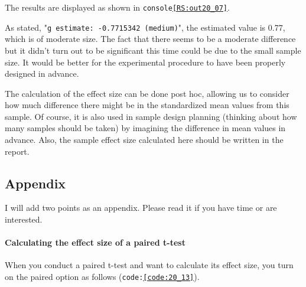 \documentclass{ltjsbook}
\begin{document}
The results are displayed as shown in \texttt{console\ref{RS:out20_07}}.


As stated, "\texttt{g estimate: -0.7715342 (medium)}", the estimated value is 0.77, which is of moderate size. The fact that there seems to be a moderate difference but it didn't turn out to be significant this time could be due to the small sample size. It would be better for the experimental procedure to have been properly designed in advance.


The calculation of the effect size can be done post hoc, allowing us to consider how much difference there might be in the standardized mean values from this sample. Of course, it is also used in sample design planning (thinking about how many samples should be taken) by imagining the difference in mean values in advance. Also, the sample effect size calculated here should be written in the report.



\subsection{Appendix}
I will add two points as an appendix. Please read it if you have time or are interested.
\paragraph{Calculating the effect size of a paired t-test} When you conduct a paired t-test and want to calculate its effect size, you turn on the paired option as follows (\texttt{code:\ref{code:20_13}}).
\end{document}
